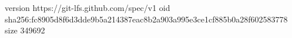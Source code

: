 version https://git-lfs.github.com/spec/v1
oid sha256:fc8905d8f6d3dde9b5a214387eac8b2a903a995e3ce1cf885b0a28f602583778
size 349692
